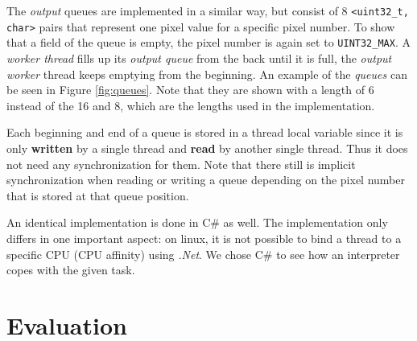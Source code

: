 The \textit{output} queues are implemented in a similar way, but consist of 8 \verb$<uint32_t, char>$ pairs that represent one pixel value for a specific pixel number. To show that a field of the queue is empty, the pixel number is again set to \verb$UINT32_MAX$. A \textit{worker thread} fills up its \textit{output queue} from the back until it is full, the \textit{output worker} thread keeps emptying from the beginning. An example of the \textit{queues} can be seen in Figure \ref{fig:queues}. Note that they are shown with a length of 6 instead of the 16 and 8, which are the lengths used in the implementation.

Each beginning and end of a queue is stored in a thread local variable since it is only \textbf{written} by a single thread and \textbf{read} by another single thread. Thus it does not need any synchronization for them. Note that there still is implicit synchronization when reading or writing a queue depending on the pixel number that is stored at that queue position.

An identical implementation is done in C\# as well. The implementation only differs in one important aspect: on linux, it is not possible to bind a thread to a specific CPU (CPU affinity) using \textit{.Net}. We chose C\# to see how an interpreter copes with the given task.


\section{Evaluation}
\label{sec:evaluation}

